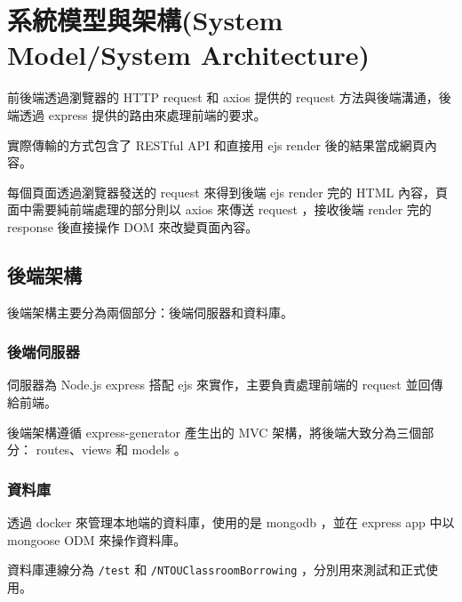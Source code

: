 \documentclass{article}
\begin{document}
\newpage

\begin{center}
	\tableofcontents
\end{center}

\newpage

\section[系統模型與架構(SYSTEM MODEL/SYSTEM ARCHITECTURE)]{系統模型與架構(System Model/System Architecture)}

\begin{center}
	
\end{center}

\bigskip

前後端透過瀏覽器的 HTTP request 和 axios 提供的 request 方法與後端溝通，後端透過 express 提供的路由來處理前端的要求。

實際傳輸的方式包含了 RESTful API 和直接用 ejs render 後的結果當成網頁內容。

每個頁面透過瀏覽器發送的 request 來得到後端 ejs render 完的 HTML 內容，頁面中需要純前端處理的部分則以 axios 來傳送 request ，接收後端 render 完的 response 後直接操作 DOM 來改變頁面內容。

\subsection{後端架構}

後端架構主要分為兩個部分：後端伺服器和資料庫。

\subsubsection{後端伺服器}

伺服器為 Node.js express 搭配 ejs 來實作，主要負責處理前端的 request 並回傳給前端。

後端架構遵循 express-generator 產生出的 MVC 架構，將後端大致分為三個部分： routes、views 和 models 。

\subsubsection{資料庫}

透過 docker 來管理本地端的資料庫，使用的是 mongodb ，並在 express app 中以 mongoose ODM 來操作資料庫。

資料庫連線分為 \verb|/test| 和 \verb|/NTOUClassroomBorrowing| ，分別用來測試和正式使用。
\end{document}
